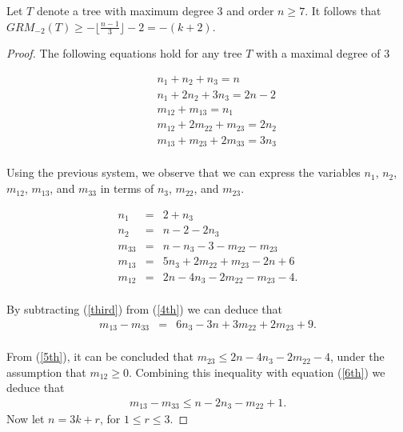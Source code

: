 \documentclass[10pt,a4paper]{amsart}
\begin{document}
\begin{theorem}
Let $T$ denote a tree with maximum degree $3$ and order $n\geq 7$. 
It follows that $GRM_{-2}(T)\geq -\lfloor \frac{n-1}{3} \rfloor-2=-(k+2)$. %
\end{theorem}

\begin{proof}
The following equations hold for any tree $T$ with a maximal degree of $3$

\begin{eqnarray}
    &&n_1 + n_2 + n_3  = n \nonumber\\ 
    &&n_1 + 2n_2 + 3n_3 = 2n-2 \nonumber\\ 
    &&m_{12} + m_{13}  = n_1 \label{1st}\\
    &&m_{12} + 2m_{22} + m_{23}  = 2n_2 \nonumber \\ 
    &&m_{13} + m_{23} + 2m_{33}  = 3n_3 \label{second}\\  \nonumber
\end{eqnarray}



Using the previous system, we observe that we can express the variables $n_1$, $n_2$, $m_{12}$, $m_{13}$, and $m_{33}$ in terms of $n_3$, $m_{22}$, and $m_{23}$.

\begin{eqnarray}
    n_1 &=& 2 + n_3\label{2nd}\\
    n_2 &=& n - 2 - 2n_3\label{second'}\\
    m_{33}&=&n-n_3-3-m_{22} - m_{23} \label{third}\\
    m_{13}&=&5n_3+2m_{22} + m_{23}-2n+6 \label{4th}\\
    m_{12}&=&2n-4n_3-2m_{22} - m_{23}-4\label{5th}.\\ \nonumber
\end{eqnarray}

By subtracting   (\ref{third}) from (\ref{4th}) we can deduce that 
\begin{eqnarray}
    m_{13}-m_{33}&=& 6n_3-3n+3m_{22}+2m_{23}+9 \label{6th}.  \\ \nonumber
 \end{eqnarray}

From (\ref{5th}),  it can be concluded that 
$m_{23}\leq  2n-4n_3-2m_{22} -4$, under the assumption that $m_{12} \geq 0$.
Combining this inequality with equation (\ref{6th}) we deduce that
\begin{eqnarray}
m_{13}-m_{33}\leq n-2n_3-m_{22}+1.\label{7th}
\end{eqnarray}
Now let $n=3k+r$, for $1\leq r\leq 3$.


\end{proof}
\end{document}
